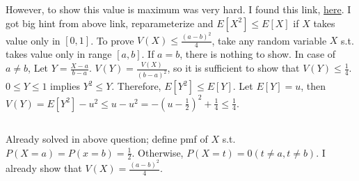 \documentclass{article}
\begin{document}
However, to show this value is maximum was very hard.
I found this link, \href{https://stats.stackexchange.com/questions/45588/variance-of-a-bounded-random-variable}{here}.
I got big hint from above link, reparameterize and $E[X^2] \leq E[X]$ if $X$ takes value only in $[0,1]$.
To prove $V(X) \leq \frac{(a-b)^2}{4}$, take any random variable $X$ s.t. takes value only in range $[a,b]$.
If $a=b$, there is nothing to show.
In case of $a \neq b$, Let $Y=\frac{X-a}{b-a}$.
$V(Y)=\frac{V(X)}{(b-a)^2}$, so it is sufficient to show that $V(Y) \leq \frac{1}{4}$.
$0 \leq Y \leq 1$ implies $Y^2 \leq Y$.
Therefore, $E[Y^2] \leq E[Y]$.
Let $E[Y]=u$, then
$V(Y) = E[Y^2] - u^2
\leq u - u^2
= -(u-\frac{1}{2})^2 + \frac{1}{4}
\leq \frac{1}{4}$.

\subsection{}
Already solved in above question; define pmf of $X$ s.t. $P(X=a)=P(x=b)=\frac{1}{2}$.
Otherwise, $P(X=t)=0 (t \neq a, t \neq b)$.
I already show that $V(X) = \frac{(a-b)^2}{4}$.
\end{document}
